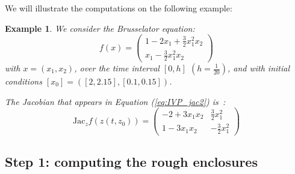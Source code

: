 \documentclass{sig-alternate-05-2015} %
\newcommand\ForAuthors[1]%
 {\par\smallskip                     %
  \begin{center}%
   \fbox%
   {\parbox{0.9\linewidth}%
    {\raggedright\sc--- #1}%
   }%
  \end{center}%
  \par\smallskip                     %
 }
\newtheorem{example}{Example}
\def\intvl#1{\mbox{$[ #1 ]$}}
\begin{document}
We will illustrate the computations on the following example:
\begin{example}
\label{running0}
\label{running1}
We consider the Brusselator equation: 
$$ f(x) = \left(\begin{array}{l}
1-2 x_1+\frac{3}{2} x_1^2 x_2 \\
x_1-\frac{3}{2} x_1^2x_2
\end{array}\right)$$
\noindent with $x=(x_1,x_2)$, over the time interval $\left[0,h\right]$ 
$\left(h=\frac{1}{20}\right)$, and with initial conditions
$\intvl{x_0}=\left([2, 2.15],[0.1, 0.15]\right)$.

The Jacobian that appears in Equation (\ref{eq:IVP_jac2}) is~: 
$$
\mbox{Jac}_z f(z(t,z_0)) = \left(\begin{array}{cc} 
-2+3x_1x_2  & \frac{3}{2} x^2_1 \\
1-3x_1x_2 & -\frac{3}{2} x^2_1
\end{array}\right)
$$
\end{example}

\subsection{Step 1: computing the rough enclosures}
\label{roughenc}
\end{document}
